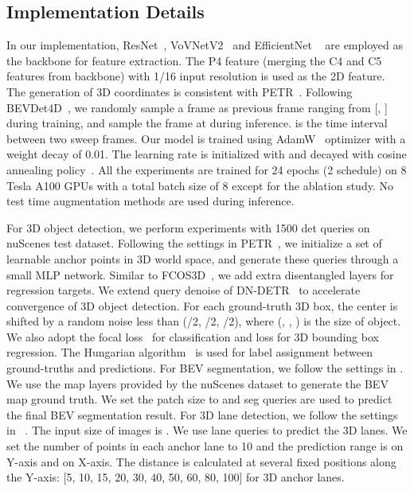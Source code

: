 \documentclass[10pt,twocolumn,letterpaper]{article}
\begin{document}
\subsection{Implementation Details}
In our implementation, ResNet~\cite{he2016resnet}, VoVNetV2~\cite{lee2020centermask} and EfficientNet ~\cite{tan2019efficientnet} are employed as the backbone for feature extraction. The P4 feature (merging the C4 and C5 features from backbone) with 1/16 input resolution is used as the 2D feature. The generation of 3D coordinates is consistent with PETR~\cite{liu2022petr}. Following BEVDet4D~\cite{huang2022bevdet4d}, we randomly sample a frame as previous frame ranging from [, ] during training, and sample the frame at  during inference.
 is the time interval between two sweep frames. Our model is trained using AdamW~\cite{loshchilov2017decoupled} optimizer with a weight decay of 0.01. The learning rate is initialized with  and decayed with cosine annealing policy~\cite{loshchilov2016sgdr}. All the experiments are trained for 24 epochs (2 schedule) on 8 Tesla A100 GPUs with a total batch size of 8 except for the ablation study. No test time augmentation methods are used during inference.

For 3D object detection, we perform experiments with 1500 det queries on nuScenes test dataset. Following the settings in PETR~\cite{liu2022petr}, we initialize a set of learnable anchor points in 3D world space, and generate these queries through a small MLP network. Similar to FCOS3D~\cite{wang2021fcos3d}, we add extra disentangled layers for regression targets. 
We extend query denoise of DN-DETR~\cite{li2022dn} to accelerate convergence of 3D object detection. For each ground-truth 3D box, the center is shifted by a random noise less than (/2, /2, /2), where (, , ) is the size of object.
We also adopt the focal loss~\cite{lin2017focal} for classification and  loss for 3D bounding box regression. The Hungarian algorithm~\cite{kuhn1955hungarian} is used for label assignment between ground-truths and predictions. For BEV segmentation, we follow the settings in \cite{philion2020lift}. We use the map layers provided by the nuScenes dataset to generate the  BEV map ground truth. We set the patch size to  and  seg queries are used to predict the final BEV segmentation result. For 3D lane detection, we follow the settings in ~\cite{chen2022persformer}.
The input size of images is . We use  lane queries to predict the 3D lanes.  
We set the number of points in each anchor lane to 10 and the prediction range is  on Y-axis and  on X-axis. The distance is calculated at several fixed positions along the Y-axis: [5, 10, 15, 20, 30, 40, 50, 60, 80, 100] for 3D anchor lanes.  
\end{document}
